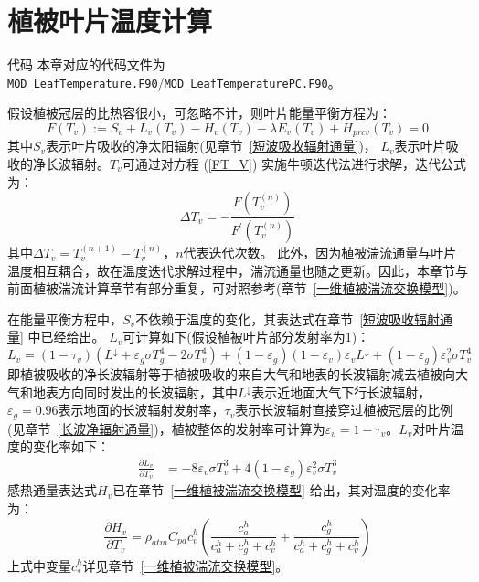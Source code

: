 \chapter{植被叶片温度计算}\label{植被叶片温度计算}
\begin{mymdframed}{代码}
本章对应的代码文件为\texttt{MOD\_LeafTemperature.F90}/\texttt{MOD\_LeafTemperaturePC.F90}。
\end{mymdframed}

假设植被冠层的比热容很小，可忽略不计，则叶片能量平衡方程为：
\begin{equation}\label{FT_V}
F\left(T_{v}\right):=S_{v}+L_{v}\left(T_{v}\right)-H_{v}\left(T_{v}\right)-\lambda E_{v}\left(T_{v}\right)+H_{p r c v}\left(T_{v}\right)=0
\end{equation}
其中$S_v$表示叶片吸收的净太阳辐射(见章节~\ref{短波吸收辐射通量})，
$L_v$表示叶片吸收的净长波辐射。$T_v$可通过对方程 (\ref{FT_V}) 实施牛顿迭代法进行求解，迭代公式为：
\begin{equation}
\Delta T_{v}=-\frac{F\left(T_{v}^{(n)}\right)}{F^{\prime}\left(T_{v}^{(n)}\right)}
\end{equation}
其中$\Delta T_v=T_v^{\left(n+1\right)}-T_v^{\left(n\right)}$，$n$代表迭代次数。
此外，因为植被湍流通量与叶片温度相互耦合，故在温度迭代求解过程中，湍流通量也随之更新。因此，本章节与前面植被湍流计算章节有部分重复，可对照参考(章节~\ref{一维植被湍流交换模型})。

在能量平衡方程中，$S_v$不依赖于温度的变化，其表达式在章节~\ref{短波吸收辐射通量} 中已经给出。
$L_v$可计算如下(假设植被叶片部分发射率为1)：
\begin{equation}
L_{v}=\left(1-\tau_{v}\right)\left(L ^\downarrow+\varepsilon_{g} \sigma T_{g}^{4}-2 \sigma T_{v}^{4}\right) + \left( 1- \varepsilon_{g} \right )\left(1-\varepsilon_{v} \right)\varepsilon_{v} L^\downarrow + \left( 1- \varepsilon_{g} \right ) \varepsilon_{v}^2 \sigma T_{v}^4
\end{equation}
即植被吸收的净长波辐射等于植被吸收的来自大气和地表的长波辐射减去植被向大气和地表方向同时发出的长波辐射，其中$L^\downarrow$表示近地面大气下行长波辐射，$\varepsilon_g=0.96$表示地面的长波辐射发射率，$\tau_{v}$表示长波辐射直接穿过植被冠层的比例(见章节~\ref{长波净辐射通量})，植被整体的发射率可计算为$\varepsilon_v=1-\tau_v$。$L_v$对叶片温度的变化率如下：
\begin{equation}
\begin{aligned}
 \frac{\partial L_{v}}{\partial T_{v}} &= -8 \varepsilon_{v}\sigma T_{v}^{3} + 4 \left( 1- \varepsilon_{g} \right ) \varepsilon_{v}^2 \sigma T_{v}^3
\end{aligned}
\end{equation}
感热通量表达式$H_{v}$已在章节~\ref{一维植被湍流交换模型} 给出，其对温度的变化率为：
\begin{equation}
\frac{\partial H_{v}}{\partial T_{v}}=\rho_{atm} C_{pa} c_{v}^{h} \left( \frac{c_{a}^{h}}{c_{a}^{h} + c_{g}^{h} + c_{v}^{h}} + \frac{c_{g}^{h}}{c_{a}^{h} + c_{g}^{h} + c_{v}^{h}} \right)
\end{equation}
上式中变量$c_*^h$详见章节~\ref{一维植被湍流交换模型}。

